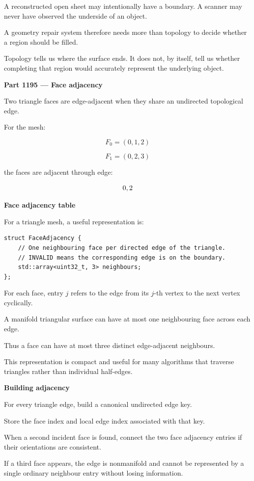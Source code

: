 A reconstructed open sheet may intentionally have a boundary. A scanner may never have observed the underside of an object.

A geometry repair system therefore needs more than topology to decide whether a region should be filled.

Topology tells us where the surface ends. It does not, by itself, tell us whether completing that region would accurately represent the underlying object.

\textbf{Part 1195 --- Face adjacency}

Two triangle faces are edge-adjacent when they share an undirected topological edge.

For the mesh:

\[
F_0=(0,1,2)
\]

\[
F_1=(0,2,3)
\]

the faces are adjacent through edge:

\[
\\{0,2\\}
\]

\textbf{Face adjacency table}

For a triangle mesh, a useful representation is:

\begin{verbatim}
struct FaceAdjacency {
    // One neighbouring face per directed edge of the triangle.
    // INVALID means the corresponding edge is on the boundary.
    std::array<uint32_t, 3> neighbours;
};
\end{verbatim}

For each face, entry \(j\) refers to the edge from its \(j\)-th vertex to the next vertex cyclically.

A manifold triangular surface can have at most one neighbouring face across each edge.

Thus a face can have at most three distinct edge-adjacent neighbours.

This representation is compact and useful for many algorithms that traverse triangles rather than individual half-edges.

\textbf{Building adjacency}

For every triangle edge, build a canonical undirected edge key.

Store the face index and local edge index associated with that key.

When a second incident face is found, connect the two face adjacency entries if their orientations are consistent.

If a third face appears, the edge is nonmanifold and cannot be represented by a single ordinary neighbour entry without losing information.

